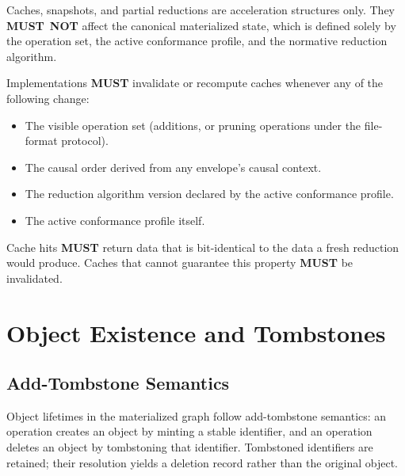\documentclass[11pt,letterpaper]{report}
\newcounter{requirement}[chapter]
\newcommand{\MUST}{\textbf{MUST}}
\newcommand{\MUSTNOT}{\textbf{MUST}\nobreak\ \textbf{NOT}}
\begin{document}
\begin{requirement}
  \label{req:semops:cache-transparency}
  Caches, snapshots, and partial reductions are acceleration
  structures only. They \MUSTNOT{} affect the canonical materialized
  state, which is defined solely by the operation set, the active
  conformance profile, and the normative reduction algorithm.

  Implementations \MUST{} invalidate or recompute caches whenever any
  of the following change:
  \begin{itemize}
    \item The visible operation set (additions, or pruning operations
      under the file-format protocol).
    \item The causal order derived from any envelope's causal
      context.
    \item The reduction algorithm version declared by the active
      conformance profile.
    \item The active conformance profile itself.
  \end{itemize}

  Cache hits \MUST{} return data that is bit-identical to the data a
  fresh reduction would produce. Caches that cannot guarantee this
  property \MUST{} be invalidated.
\end{requirement}

\section{Object Existence and Tombstones}
\label{sec:semops:tombstones}

\subsection{Add-Tombstone Semantics}

Object lifetimes in the materialized graph follow add-tombstone
semantics: an operation creates an object by minting a stable
identifier, and an operation deletes an object by tombstoning that
identifier. Tombstoned identifiers are retained; their resolution
yields a deletion record rather than the original object.
\end{document}
